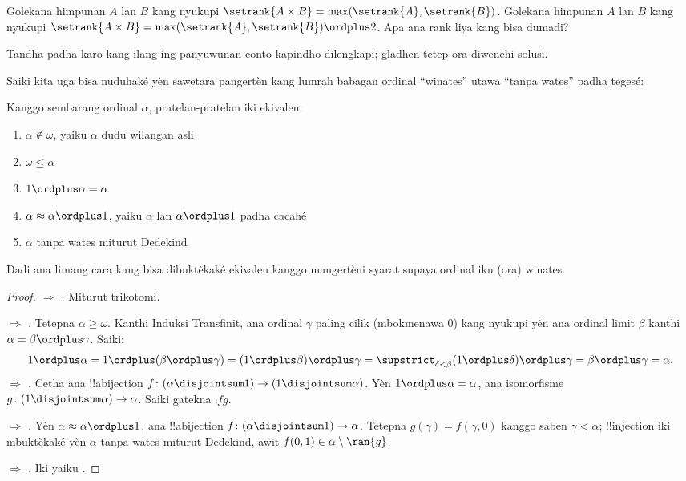 \documentclass[../../../include/open-logic-section]{subfiles}
\begin{document}
\begin{prob}
Golekana himpunan $A$ lan $B$ kang nyukupi $\setrank{A \times B}=
\max(\setrank{A}, \setrank{B})$. Golekana himpunan $A$ lan $B$ kang nyukupi
$\setrank{A \times B}=\max(\setrank{A}, \setrank{B}) \ordplus  2$. Apa
ana rank liya kang bisa dumadi?
\end{prob}
Tandha padha karo kang ilang ing panyuwunan conto kapindho dilengkapi; gladhen tetep ora diwenehi solusi.

Saiki kita uga bisa nuduhaké yèn sawetara pangertèn kang lumrah
babagan ordinal “winates” utawa “tanpa wates” padha tegesé:

\begin{lem}
Kanggo sembarang ordinal $\alpha$, pratelan-pratelan iki ekivalen:
\begin{enumerate}
	\item{} $\alpha\notin \omega$, yaiku
	$\alpha$ dudu wilangan asli
	\item{} $\omega \leq \alpha$
	\item{} $1 \ordplus  \alpha = \alpha$
	\item{} $\alpha \approx \alpha\ordplus 1$,
	yaiku $\alpha$ lan $\alpha\ordplus 1$ padha cacahé
	\item{} $\alpha$ tanpa wates miturut Dedekind
	\end{enumerate}
\end{lem}
\noindent
Dadi ana limang cara kang bisa dibuktèkaké ekivalen kanggo
mangertèni syarat supaya ordinal iku (ora) winates.
%

\begin{proof}
\emph{ $\Rightarrow$ .} Miturut
trikotomi.

\emph{ $\Rightarrow$ .} Tetepna
$\alpha \geq \omega$. Kanthi Induksi Transfinit, ana ordinal $\gamma$ paling
cilik (mbokmenawa $0$) kang nyukupi yèn ana ordinal limit
$\beta$ kanthi $\alpha = \beta \ordplus \gamma$. Saiki:
\[
	1 \ordplus \alpha =
	1 \ordplus (\beta \ordplus \gamma) =
	(1 \ordplus \beta) \ordplus \gamma =
	\supstrict_{\delta < \beta} (1 \ordplus  \delta) \ordplus  \gamma =
	\beta \ordplus  \gamma =
	\alpha.
\]
\emph{ $\Rightarrow$ .} Cetha ana
!!a{bijection} $f \colon (\alpha \disjointsum 1) \to (1
\disjointsum \alpha)$. Yèn $1 \ordplus \alpha = \alpha$, ana
isomorfisme $g \colon (1 \disjointsum \alpha) \to \alpha$. Saiki
gatekna $\comp{f}{g}$.

\emph{ $\Rightarrow$ .} Yèn
$\alpha \approx \alpha \ordplus 1$, ana !!a{bijection} $f \colon
(\alpha \disjointsum 1) \to \alpha$. Tetepna $g(\gamma) = f(\gamma, 0)$
kanggo saben $\gamma < \alpha$; !!{injection} iki mbuktèkaké yèn $\alpha$
tanpa wates miturut Dedekind, awit $f(0,1) \in \alpha \setminus \ran{g}$.

\emph{ $\Rightarrow$ .} Iki
yaiku .
\end{proof}
\end{document}
